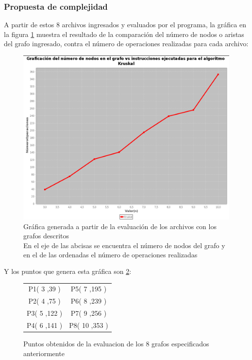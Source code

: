         \subsubsection{Propuesta de complejidad}
        A partir de estos 8 archivos ingresados y evaluados por el programa, la gráfica en la figura \ref{GraficaKruskal} muestra el resultado de la comparación del número de nodos o aristas del grafo ingresado, contra el número de operaciones realizadas para cada archivo:
        \begin{figure}[h!]
            \centering
            \includegraphics[width=16cm]{Kruskal/GraficaKruskal.png}
            \caption{Gráfica generada a partir de la evaluación de los archivos con los grafos descritos\\ En el eje de las abcisas se encuentra el número de nodos del grafo y en el de las ordenadas el número de operaciones realizadas}
            \label{GraficaKruskal}
        \end{figure}
        Y los puntos que genera esta gráfica son \ref{PuntosKruskal}:
        \begin{figure}[h!]
            \centering
            \begin{tabular}{c c}
                P1( 3 ,39 ) & P5( 7 ,195 ) \\
                P2( 4 ,75 ) & P6( 8 ,239 )\\
                P3( 5 ,122 ) & P7( 9 ,256 )\\
                P4( 6 ,141 ) & P8( 10 ,353 )\\
            \end{tabular}
            \caption{Puntos obtenidos de la evaluacion de los 8 grafos especificados anteriormente}
            \label{PuntosKruskal}
        \end{figure}
        
